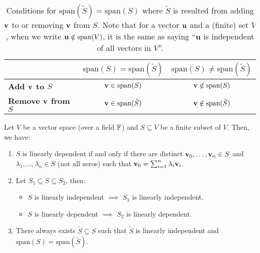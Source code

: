 \begin{table}[ht!]
    \begin{center}
    \begin{tabular}{@{}lcc@{}}
	\toprule
	                               & \multicolumn{1}{c}{\textbf{$\mathrm{span}(S)=\mathrm{span}(\tilde S)$}} & \multicolumn{1}{c}{\textbf{$\mathrm{span}(S)\ne\mathrm{span}(\tilde S)$}} \\ \midrule
	\textbf{Add ${\bf v}$ to $S$}      & ${\bf v}\in\mathrm{span}(S)$                                                & ${\bf v}\notin\mathrm{span}(S)$                                               \\
	\textbf{Remove ${\bf v}$ from $S$} & ${\bf v}\in\mathrm{span}(\tilde S)$                                         & ${\bf v}\notin\mathrm{span}(\tilde S)$                                        \\ \bottomrule
	\end{tabular}
    \caption{Conditions for $\mathrm{span}(\tilde S) = \mathrm{span}(S)$ where $\tilde S$ is resulted from adding ${\bf v}$ to or removing ${\bf v}$ from $S$. Note that for a vector ${\bf u}$ and a (finite) set $V$, when we write ${\bf u}\notin\mathrm{span}(V)$, it is the same as saying ``${\bf u}$ is independent of all vectors in $V$''.}
    \end{center}
\end{table}

\begin{definition}
	Let $V$ be a vector space (over a field $\mathbb{F}$) and $S\subseteq V$ be a finite subset of $V$. Then, we have:
	\begin{enumerate}
		\item $S$ is linearly dependent if and only if there are distinct ${\bf v}_0, \dots, {\bf v}_n\in S$ and $\lambda_1, \dots, \lambda_n\in S$ (not all zeros) such that ${\bf v}_0 = \sum_{i=1}^n\lambda_i{\bf v}_i$.
		\item Let $S_1 \subseteq S \subseteq S_2$, then:
		\begin{itemize}
			\item $S$ is linearly independent $\implies$ $S_1$ is linearly independent.
			\item $S$ is linearly dependent $\implies$ $S_2$ is linearly dependent.	
		\end{itemize} 

		\item There always exists $\tilde S \subseteq S$ such that $\tilde S$ is linearly independent and $\mathrm{span}(S) = \mathrm{span}(\tilde S)$.
	\end{enumerate} 
\end{definition} 

